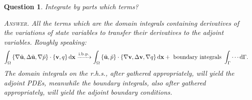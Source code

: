 \documentclass[oneside,11pt]{book}
\numberwithin{equation}{section}
\newtheorem{question}{Question}[section]
\begin{document}
\begin{question}
    Integrate by parts which terms?
    
    \textsc{Answer.} All the terms which are the domain integrals containing derivatives of the variations of state variables to transfer their derivatives to the adjoint variables. Roughly speaking:
    \begin{align*}
        \int_\Omega \left\{\nabla\tilde{\bf u},\Delta\tilde{\bf u},\nabla\tilde{p}\right\}\cdot\left\{{\bf v},q\right\}{\rm d}{\bf x}\xrightarrow{\rm i.b.p.}\int_\Omega \left\{\tilde{\bf u},\tilde{p}\right\}\cdot\left\{\nabla{\bf v},\Delta{\bf v},\nabla q\right\}{\rm d}{\bf x} + \mbox{ boundary integrals } \int_\Gamma \cdots{\rm d}\Gamma.
    \end{align*}
    The domain integrals on the r.h.s., after gathered appropriately, will yield the adjoint PDEs, meanwhile the boundary integrals, also after gathered appropriately, will yield the adjoint boundary conditions.
\end{question}
\end{document}
